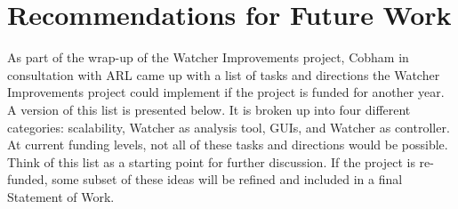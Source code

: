 \documentclass{report}
\begin{document}
\section{Recommendations for Future Work}
As part of the wrap-up of the Watcher Improvements project, Cobham in consultation with ARL came up with a list of tasks and directions
the Watcher Improvements project could implement if the project is funded for another year. A version of this list is presented below. It is 
broken up into four different categories: scalability, Watcher as analysis tool, GUIs, and Watcher as controller. 
At current funding levels, not all of these tasks and directions would be possible. Think of this list as a starting point for further
discussion. If the project is re-funded, some subset of these ideas will be refined and included in a final Statement of Work. 
\end{document}
